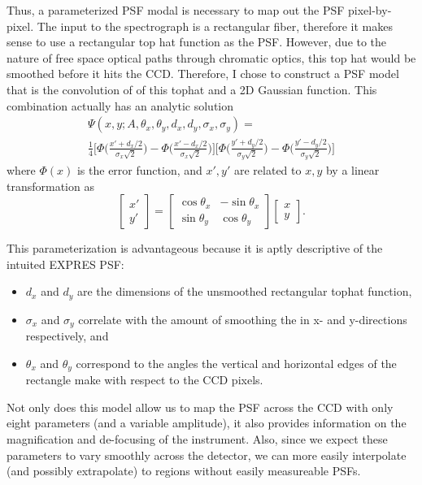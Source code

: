 \documentclass[11pt]{article}
\begin{document}
Thus, a parameterized PSF modal is necessary to map out the PSF pixel-by-pixel. The input to the spectrograph is a rectangular fiber, therefore it makes sense to use a rectangular top hat function as the PSF. However, due to the nature of free space optical paths through chromatic optics, this top hat would be smoothed before it hits the CCD. Therefore, I chose to construct a PSF model that is the convolution of of this tophat and a 2D Gaussian function. This combination actually has an analytic solution
\begin{multline}
    \Psi(x, y; A, \theta_x, \theta_y, d_x, d_y, \sigma_x, \sigma_y) = \\
    \frac{1}{4} \Bigg[\Phi\bigg(\frac{x' + d_x/2}{\sigma_x \sqrt{2}}\bigg) - \Phi\bigg(\frac{x' - d_x/2}{\sigma_x \sqrt{2}}\bigg)\Bigg] \Bigg[\Phi\bigg(\frac{y' + d_y/2}{\sigma_y \sqrt{2}}\bigg) - \Phi\bigg(\frac{y' - d_y/2}{\sigma_y \sqrt{2}}\bigg)\Bigg]
    \label{eq:expres_psf}
\end{multline}
where $\Phi(x)$ is the error function, and $x',y'$ are related to $x,y$ by a linear transformation as
\begin{equation}
    \begin{bmatrix}x' \\ y' \end{bmatrix} = 
    \begin{bmatrix}\cos \theta_x & -\sin\theta_x \\ \sin \theta_y & \cos\theta_y\end{bmatrix}\begin{bmatrix}x \\ y\end{bmatrix}.
\end{equation}

This parameterization is advantageous because it is aptly descriptive of the intuited EXPRES PSF:
\begin{itemize}
    \item $d_x$ and $d_y$ are the dimensions of the unsmoothed rectangular tophat function,
    \item $\sigma_x$ and $\sigma_y$ correlate with the amount of smoothing the in x- and y-directions respectively, and
    \item $\theta_x$ and $\theta_y$ correspond to the angles the vertical and horizontal edges of the rectangle make with respect to the CCD pixels.
\end{itemize}
Not only does this model allow us to map the PSF across the CCD with only eight parameters (and a variable amplitude), it also provides information on the magnification and de-focusing of the instrument. Also, since we expect these parameters to vary smoothly across the detector, we can more easily interpolate (and possibly extrapolate) to regions without easily measureable PSFs.
\end{document}
